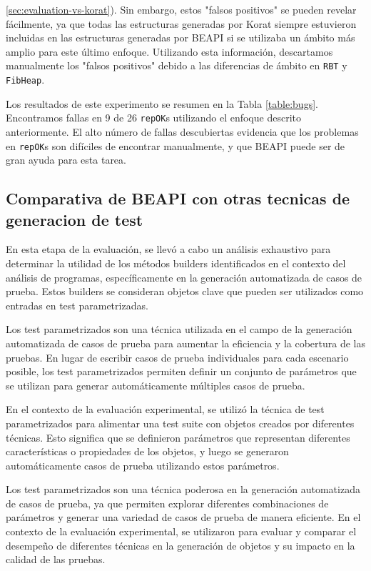 \ref{sec:evaluation-vs-korat}). Sin embargo, estos "falsos positivos" se pueden revelar fácilmente, ya que todas las estructuras generadas por \textsf{Korat} siempre estuvieron incluidas en las estructuras generadas por \textsf{BEAPI} si se utilizaba un ámbito más amplio para este último enfoque. Utilizando esta información, descartamos manualmente los "falsos positivos" debido a las diferencias de ámbito en \texttt{RBT} y \texttt{FibHeap}.

Los resultados de este experimento se resumen en la Tabla \ref{table:bugs}. Encontramos fallas en 9 de 26 \texttt{repOK}s utilizando el enfoque descrito anteriormente. El alto número de fallas descubiertas evidencia que los problemas en \texttt{repOK}s son difíciles de encontrar manualmente, y que \textsf{BEAPI} puede ser de gran ayuda para esta tarea.

\subsection{Comparativa de BEAPI con otras tecnicas de generacion de test}

\hspace{1cm}

En esta etapa de la evaluación, se llevó a cabo un análisis exhaustivo para determinar la utilidad de los métodos builders identificados en el contexto del análisis de programas, específicamente en la generación automatizada de casos de prueba. Estos builders se consideran objetos clave que pueden ser utilizados como entradas en test parametrizadas.

Los test parametrizados son una técnica utilizada en el campo de la generación automatizada de casos de prueba para aumentar la eficiencia y la cobertura de las pruebas. En lugar de escribir casos de prueba individuales para cada escenario posible, los test parametrizados permiten definir un conjunto de parámetros que se utilizan para generar automáticamente múltiples casos de prueba.

En el contexto de la evaluación experimental, se utilizó la técnica de test parametrizados para alimentar una test suite con objetos creados por diferentes técnicas. Esto significa que se definieron parámetros que representan diferentes características o propiedades de los objetos, y luego se generaron automáticamente casos de prueba utilizando estos parámetros.

Los test parametrizados son una técnica poderosa en la generación automatizada de casos de prueba, ya que permiten explorar diferentes combinaciones de parámetros y generar una variedad de casos de prueba de manera eficiente. En el contexto de la evaluación experimental, se utilizaron para evaluar y comparar el desempeño de diferentes técnicas en la generación de objetos y su impacto en la calidad de las pruebas.

